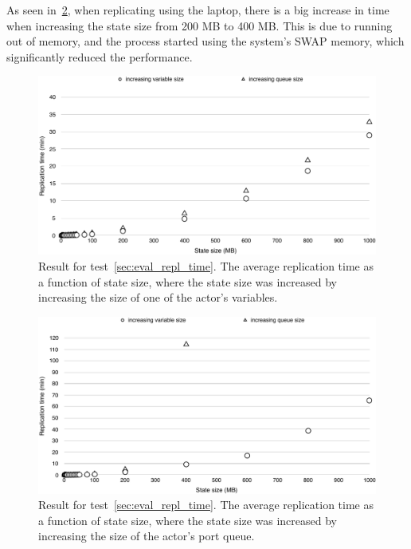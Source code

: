 \documentclass{cslthse-msc}
\begin{document}
As seen in~\cref{fig:replication_time_laptop}, when replicating using the laptop, there is a big increase in time when increasing the state size from 200 MB to 400 MB. This is due to running out of memory, and the process started using the system's SWAP memory, which significantly reduced the performance. 

\begin{figure}[hbt!]
\centering
\includegraphics[scale=0.5]{images/results/replication_time/server.pdf} 
\caption{Result for test~\ref{sec:eval_repl_time}. The average replication time as a function of state size, where the state size was increased by increasing the size of one of the actor's variables.} \label{fig:replication_time_server}
\end{figure}

\begin{figure}[hbt!]
\centering
\includegraphics[scale=0.5]{images/results/replication_time/laptop.pdf} 
\caption{Result for test~\ref{sec:eval_repl_time}. The average replication time as a function of state size, where the state size was increased by increasing the size of the actor's port queue.} \label{fig:replication_time_laptop}
\end{figure}
\end{document}
